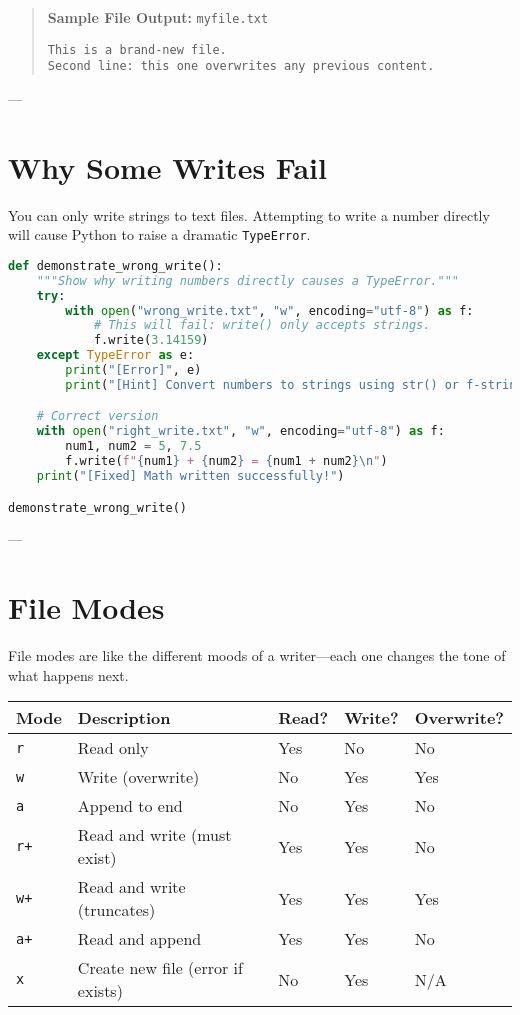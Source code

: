 \begin{quote}
\textbf{Sample File Output:} \texttt{myfile.txt}
\begin{verbatim}
This is a brand-new file.
Second line: this one overwrites any previous content.
\end{verbatim}
\end{quote}

---

\section{Why Some Writes Fail}

You can only write strings to text files.  
Attempting to write a number directly will cause Python to raise a dramatic \texttt{TypeError}.

\begin{lstlisting}[language=Python, caption={Example 2: Handling write errors with style.}]
def demonstrate_wrong_write():
    """Show why writing numbers directly causes a TypeError."""
    try:
        with open("wrong_write.txt", "w", encoding="utf-8") as f:
            # This will fail: write() only accepts strings.
            f.write(3.14159)
    except TypeError as e:
        print("[Error]", e)
        print("[Hint] Convert numbers to strings using str() or f-strings.")

    # Correct version
    with open("right_write.txt", "w", encoding="utf-8") as f:
        num1, num2 = 5, 7.5
        f.write(f"{num1} + {num2} = {num1 + num2}\n")
    print("[Fixed] Math written successfully!")

demonstrate_wrong_write()
\end{lstlisting}

---

\section{File Modes}

File modes are like the different moods of a writer—each one changes the tone of what happens next.

\begin{center}
\begin{tabular}{l l l l l}
\textbf{Mode} & \textbf{Description} & \textbf{Read?} & \textbf{Write?} & \textbf{Overwrite?} \\
\hline
\texttt{r} & Read only & Yes & No & No \\
\texttt{w} & Write (overwrite) & No & Yes & Yes \\
\texttt{a} & Append to end & No & Yes & No \\
\texttt{r+} & Read and write (must exist) & Yes & Yes & No \\
\texttt{w+} & Read and write (truncates) & Yes & Yes & Yes \\
\texttt{a+} & Read and append & Yes & Yes & No \\
\texttt{x} & Create new file (error if exists) & No & Yes & N/A \\
\end{tabular}
\end{center}

